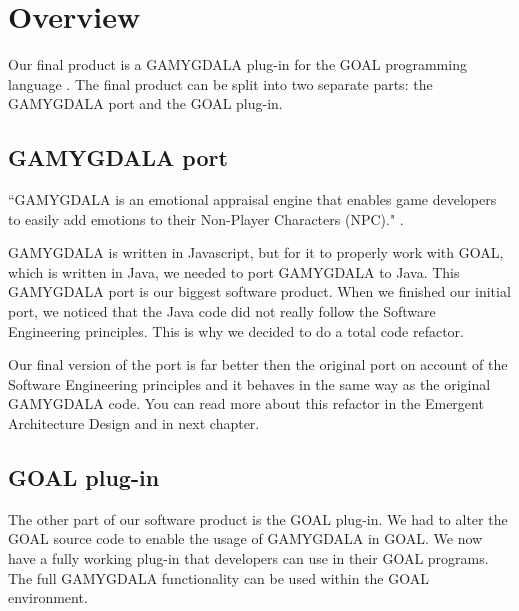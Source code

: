 \section{Overview}
Our final product is a GAMYGDALA \citep{gamygdala} plug-in for the GOAL programming language \citep{goal}. The final product can be split into two separate parts: the GAMYGDALA port and the GOAL plug-in.

\subsection{GAMYGDALA port}
``GAMYGDALA is an emotional appraisal engine that enables game developers to easily add emotions to their Non-Player Characters (NPC)." \citep{gamygdala}. \par
GAMYGDALA is written in Javascript, but for it to properly work with GOAL, which is written in Java, we needed to port GAMYGDALA to Java. This GAMYGDALA port is our biggest software product. When we finished our initial port, we noticed that the Java code did not really follow the Software Engineering principles. This is why we decided to do a total code refactor. \par 
Our final version of the port is far better then the original port on account of the Software Engineering principles and it behaves in the same way as the original GAMYGDALA code. You can read more about this refactor in the Emergent Architecture Design \citep{ead} and in next chapter.

\subsection{GOAL plug-in}
The other part of our software product is the GOAL plug-in. We had to alter the GOAL source code to enable the usage of GAMYGDALA in GOAL. We now have a fully working plug-in that developers can use in their GOAL programs. The full GAMYGDALA functionality can be used within the GOAL environment.